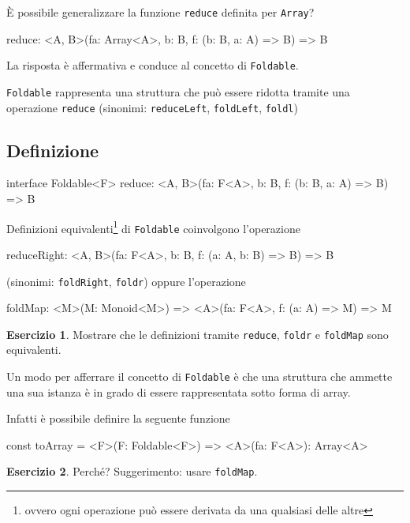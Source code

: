 \documentclass[12pt]{article}
\theoremstyle{definition}
\newtheorem{exercise}{Esercizio}[section]
\newenvironment{code}
  {\vspace{0.5cm} \VerbatimEnvironment\begin{typescriptcode}}
  {\end{typescriptcode} \vspace{0.2cm}}
\begin{document}
È possibile generalizzare la funzione \texttt{reduce} definita per \texttt{Array}?

\begin{code}
reduce: <A, B>(fa: Array<A>, b: B, f: (b: B, a: A) => B) => B
\end{code}

La risposta è affermativa e conduce al concetto di \texttt{Foldable}.

\texttt{Foldable} rappresenta una struttura che può essere ridotta tramite una operazione \texttt{reduce}
(sinonimi: \texttt{reduceLeft}, \texttt{foldLeft}, \texttt{foldl})

\subsection{Definizione}

\begin{code}
interface Foldable<F> {
  reduce: <A, B>(fa: F<A>, b: B, f: (b: B, a: A) => B) => B
}
\end{code}

Definizioni equivalenti\footnote{ovvero ogni operazione può essere derivata da una qualsiasi delle altre} di \texttt{Foldable}
coinvolgono l'operazione

\begin{code}
reduceRight: <A, B>(fa: F<A>, b: B, f: (a: A, b: B) => B) => B
\end{code}

(sinonimi: \texttt{foldRight}, \texttt{foldr}) oppure l'operazione

\begin{code}
foldMap: <M>(M: Monoid<M>) =>
  <A>(fa: F<A>, f: (a: A) => M) => M
\end{code}

\begin{exercise}
Mostrare che le definizioni tramite \texttt{reduce}, \texttt{foldr} e \texttt{foldMap} sono equivalenti.
\end{exercise}

Un modo per afferrare il concetto di \texttt{Foldable} è che una struttura che ammette una sua istanza
è in grado di essere rappresentata sotto forma di array.

Infatti è possibile definire la seguente funzione

\begin{code}
const toArray = <F>(F: Foldable<F>) => <A>(fa: F<A>): Array<A>
\end{code}

\begin{exercise}
Perché? Suggerimento: usare \texttt{foldMap}.
\end{exercise}
\end{document}
